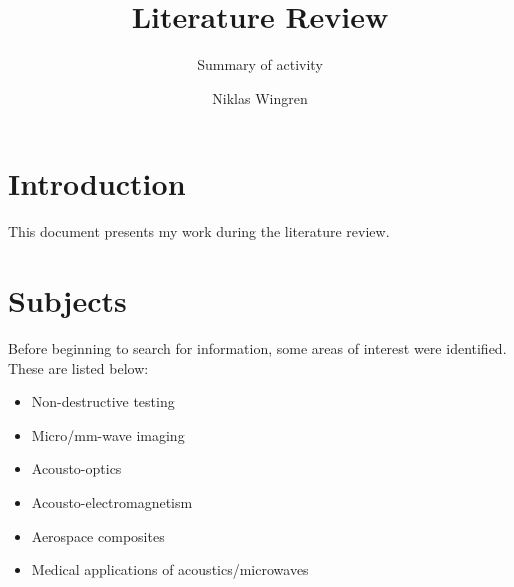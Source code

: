 \documentclass[10pt,a4paper,draft]{scrartcl}
\author{Niklas Wingren}
\title{Literature Review}
\subtitle{Summary of activity}
\begin{document}
	
	\maketitle
	
	\section{Introduction}
	This document presents my work during the literature review.
	
	\section{Subjects}
	Before beginning to search for information, some areas of interest were identified. These are listed below:
	
	\begin{itemize}
		\item Non-destructive testing
		\item Micro/mm-wave imaging
		\item Acousto-optics
		\item Acousto-electromagnetism
		\item Aerospace composites
		\item Medical applications of acoustics/microwaves
	\end{itemize}
	
	\begin{comment}
	\subsection{Acousto-electromagnetism}
	What is meant with the term "acousto-electromagnetism" is interaction between acoustics and electromagnetics in a more general sense than what is done in acousto-optics. The primary thought was that this would include phenomena which would occur at lower than optical frequencies (for example at mm-waves).
	
	Much work has been done at the University of Minnesota Radiation Lab when it comes to an electromagnetic view of the interaction \cite{Lawrence2001}\cite{Sarabandi2003}\cite{Buerkle2007}\cite{Buerkle2008}\cite{Buerkle2009}. The mechanism of interaction is based on both density variation and boundary perturbation of a target \cite{Buerkle2007}. The approach is very much based on radar since they consider electromagnetic detection of a discrete target, and acoustic waves are used to better illuminate said target. Analytic solutions exist for dielectric \cite{Lawrence2001} and metallic \cite{Sarabandi2003} infinite cylinders. There are also numeric simulations using the same approach, but for more complex targets \cite{Buerkle2008}\cite{Buerkle2009}.
	\end{comment}
	
\end{document}
